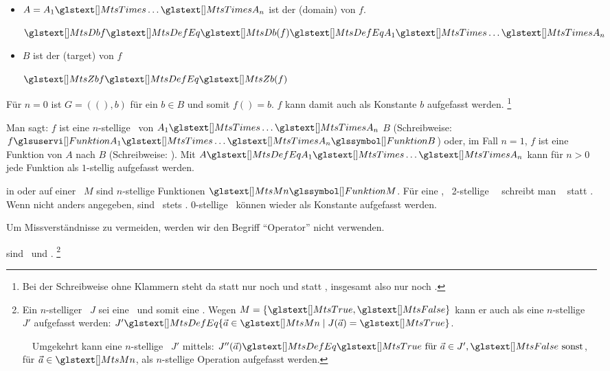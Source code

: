 \begin{description}
\begin{itemize}
		\item $A = A_1 \MtsTimes \dots \MtsTimes A_n$ ist der  (domain) von $f$.

		$\MtsDb f \MtsDefEq \MtsDb(f) \MtsDefEq A_1 \MtsTimes \dots \MtsTimes A_n$

		\item $B$ ist der  (target) von $f$

		$\MtsZb f \MtsDefEq \MtsZb(f)$
	\end{itemize}
	Für $n = 0$ ist $G = ((),b)$ für ein $b \in B$ und somit $f() = b$. $f$ kann damit auch als Konstante $b$ aufgefasst werden.%
	\footnote{%
		Bei der Schreibweise ohne Klammern steht da statt  nur noch  und statt , insgesamt also nur noch .
	}

	Man sagt: $f$ ist eine $n$-stellige \Funktion\ von $A_1 \MtsTimes \dots \MtsTimes A_n$  $B$ (Schreibweise: $\FunktionDef{f}{A_1 \MtsTimes \dots \MtsTimes A_n}{B}$) oder, im Fall $n=1$, $f$ ist eine Funktion von $A$ nach $B$ (Schreibweise: ).
	Mit $A \MtsDefEq A_1 \MtsTimes \dots \MtsTimes A_n$ kann für $n > 0$ jede Funktion als $1$-stellig aufgefasst werden.

	\item [\Operationen] in oder auf einer \Menge\ $M$ sind $n$-stellige Funktionen $\MtsMn \MtsFktArrow M$.
	Für eine , \textdh\ 2-stellige \Operation\ \BspOpB\ schreibt man \textiAlg\  statt .
	Wenn nicht anders angegeben, sind \Operationen\ stets \binaer.
	0-stellige \Operationen\ können wieder als Konstante aufgefasst werden.

	Um Missverständnisse zu vermeiden, werden wir den Begriff "`Operator"' nicht verwenden.

	\item [\Junktoren] sind \aussagenlogischeRelationen\ und \aOperationen.%
	\footnote{\label{def-Junktor}%
		Ein $n$-stelliger \Junktor\ $J$ sei eine \Operation\ und somit eine \Funktion.
		Wegen $M = \{\MtsTrue,\MtsFalse\}$ kann er auch als eine $n$-stellige \Relation\ $J'$ aufgefasst werden:
		$J' \MtsDefEq \MengeDef{\vec{a} \in \MtsMn}{J(\vec{a}) = \MtsTrue}$.

		~~Umgekehrt kann eine $n$-stellige \aussagenlogischeRelation\ $J'$ mittels:
		$J''(\vec{a}) \MtsDefEq \MtsTrue \text{ für } \vec{a} \in J', \MtsFalse \text{ sonst}$, für $\vec{a} \in \MtsMn$, als $n$-stellige Operation aufgefasst werden.

}
\end{description}
